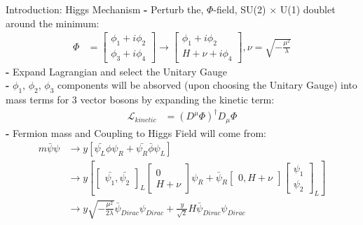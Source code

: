 \documentclass[pdf, 9pt]{beamer}
\begin{document}
  \begin{frame}{Introduction: Higgs Mechanism}
    \textbf{-} Perturb the, $\Phi$-field, SU(2) $\times$ U(1) doublet around the minimum:\\\vspace{-0.5cm}
    \begin{align}
      \Phi& =\begin{bmatrix} \phi_1 + i\phi_2 \\ \phi_3 + i\phi_4 \end{bmatrix}
      \rightarrow \begin{bmatrix} \phi_1 + i\phi_2 \\ H + \nu + i\phi_4 \end{bmatrix},
      \nu = \sqrt{-\frac{\mu^2}{\lambda}}
    \end{align}
    \textbf{-} Expand Lagrangian and select the Unitary Gauge\\
    \textbf{-} $\phi_1$, $\phi_2$, $\phi_3$ components will be absorved (upon choosing the Unitary Gauge) into mass terms for 3 vector bosons by expanding the kinetic term:\\\vspace{-0.5cm}
    \begin{subequations}
    \begin{align}
      \mathcal{L}_{kinetic}& = (D^{\mu}\Phi)^{\dagger}D_{\mu}\Phi
    \end{align}
    \end{subequations}
    \textbf{-} Fermion mass and Coupling to Higgs Field will come from:\\\vspace{-0.5cm}
    \begin{subequations}
    \begin{align}
      m\bar{\psi}\psi& \rightarrow y [\bar{\psi_L}\phi\psi_R + \bar{\psi_R}\bar{\phi}\psi_L]\\
      & \rightarrow y[\begin{bmatrix} \bar{\psi_1}, \bar{\psi_2} \end{bmatrix}_L\begin{bmatrix} 0 \\ H + \nu \end{bmatrix} \psi_R + \bar{\psi}_R\begin{bmatrix} 0, H + \nu \end{bmatrix}\begin{bmatrix} \psi_1 \\ \psi_2 \end{bmatrix}_L]\\
      & \rightarrow y\sqrt{-\frac{\mu^2}{2\lambda}}\bar{\psi}_{Dirac}\psi_{Dirac} + \frac{y}{\sqrt{2}}H\bar\psi_{Dirac}\psi_{Dirac}
    \end{align}
    \end{subequations}
  \end{frame}
\end{document}
